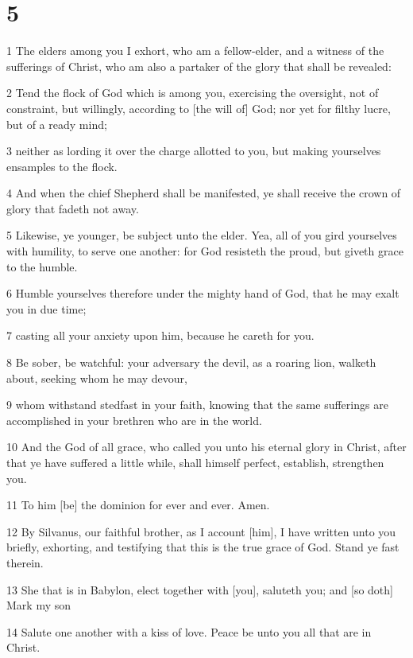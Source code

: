 \chapter{5}

\par 1 The elders among you I exhort, who am a fellow-elder, and a witness of the sufferings of Christ, who am also a partaker of the glory that shall be revealed:
\par 2 Tend the flock of God which is among you, exercising the oversight, not of constraint, but willingly, according to [the will of] God; nor yet for filthy lucre, but of a ready mind;
\par 3 neither as lording it over the charge allotted to you, but making yourselves ensamples to the flock.
\par 4 And when the chief Shepherd shall be manifested, ye shall receive the crown of glory that fadeth not away.
\par 5 Likewise, ye younger, be subject unto the elder. Yea, all of you gird yourselves with humility, to serve one another: for God resisteth the proud, but giveth grace to the humble.
\par 6 Humble yourselves therefore under the mighty hand of God, that he may exalt you in due time;
\par 7 casting all your anxiety upon him, because he careth for you.
\par 8 Be sober, be watchful: your adversary the devil, as a roaring lion, walketh about, seeking whom he may devour,
\par 9 whom withstand stedfast in your faith, knowing that the same sufferings are accomplished in your brethren who are in the world.
\par 10 And the God of all grace, who called you unto his eternal glory in Christ, after that ye have suffered a little while, shall himself perfect, establish, strengthen you.
\par 11 To him [be] the dominion for ever and ever. Amen.
\par 12 By Silvanus, our faithful brother, as I account [him], I have written unto you briefly, exhorting, and testifying that this is the true grace of God. Stand ye fast therein.
\par 13 She that is in Babylon, elect together with [you], saluteth you; and [so doth] Mark my son
\par 14 Salute one another with a kiss of love. Peace be unto you all that are in Christ.

